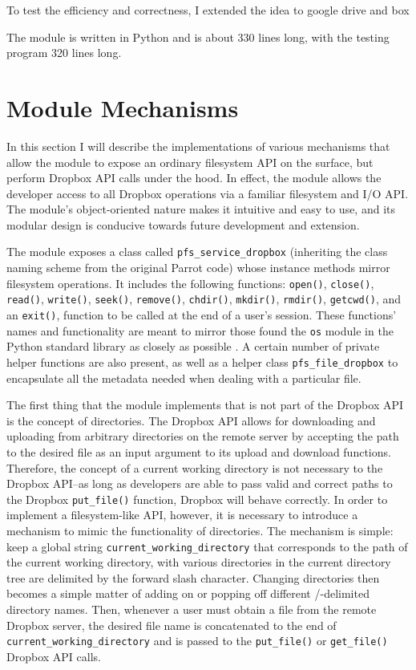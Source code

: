 \documentclass[pageno]{jpaper}
\begin{document}
To test the efficiency and correctness, I extended the idea to google drive and box 

The module is written in Python and is about 330 lines long, with the testing program 320 lines long.


\section{Module Mechanisms}
\label{sec:mechanism}
In this section I will describe the implementations of various mechanisms that allow the module to expose an ordinary filesystem API on the surface, but perform Dropbox API calls under the hood. In effect, the module allows the developer access to all Dropbox operations via a familiar filesystem and I/O API. The module's object-oriented nature makes it intuitive and easy to use, and its modular design is conducive towards future development and extension.

The module exposes a class called \texttt{pfs_service_dropbox} (inheriting the class naming scheme from the original Parrot code) whose instance methods mirror filesystem operations. It includes the following functions: \texttt{open()}, \texttt{close()}, \texttt{read()}, \texttt{write()}, \texttt{seek()}, \texttt{remove()}, \texttt{chdir()}, \texttt{mkdir()}, \texttt{rmdir()}, \texttt{getcwd()}, and an \texttt{exit()}, function to be called at the end of a user's session. These functions' names and functionality are meant to mirror those found the \texttt{os} module in the Python standard library as closely as possible \cite{ospythonpage}. A certain number of private helper functions are also present, as well as a helper class \texttt{pfs_file_dropbox} to encapsulate all the metadata needed when dealing with a particular file.

The first thing that the module implements that is not part of the Dropbox API is the concept of directories. The Dropbox API allows for downloading and uploading from arbitrary directories on the remote server by accepting the path to the desired file as an input argument to its upload and download functions. Therefore, the concept of a current working directory is not necessary to the Dropbox API--as long as developers are able to pass valid and correct paths to the Dropbox \texttt{put_file()} function, Dropbox will behave correctly. In order to implement a filesystem-like API, however, it is necessary to introduce a mechanism to mimic the functionality of directories. The mechanism is simple: keep a global string \texttt{current_working_directory} that corresponds to the path of the current working directory, with various directories in the current directory tree are delimited by the forward slash character. Changing directories then becomes a simple matter of adding on or popping off different /-delimited directory names. Then, whenever a user must obtain a file from the remote Dropbox server, the desired file name is concatenated to the end of \texttt{current_working_directory} and is passed to the \texttt{put_file()} or \texttt{get_file()} Dropbox API calls.
\end{document}

